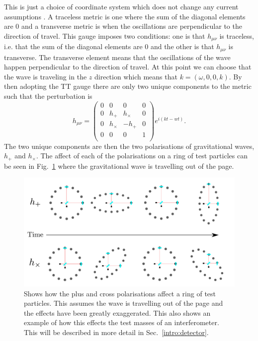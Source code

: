 This is just a choice of coordinate system which does not change any current assumptions . A traceless metric is one where the sum of the diagonal elements are 0 and a transverse metric is when the oscillations are perpendicular to the direction of travel. 
This gauge imposes two conditions: one is that $h_{\mu \nu}$ is traceless, i.e. that the sum of the diagonal elements are 0 and the other is that $h_{\mu \nu}$ is transverse. 
The transverse element means that the oscillations of the wave happen perpendicular to the direction of travel.
At this point we can choose that the wave is traveling in the $z$ direction which means that $k = (\omega,0,0,k)$.
By then adopting the TT gauge there are only two unique components to the metric such that the perturbation is
\begin{equation}
\label{intro:gw:gravwave}
h_{\mu \nu} = \left( 
\begin{matrix}
0 & 0 & 0 & 0 \\
0 & h_{+} & h_{\times} & 0 \\
0 & h_{\times} & -h_{+} & 0 \\
0 & 0 & 0 & 1 \\
\end{matrix}
\right) 
e^{i(kt - wt)}.
\end{equation}
The two unique components are then the two polarisations of gravitational waves, $h_{+}$ and $h_{\times}$.
The affect of each of the polarisations on a ring of test particles can be seen in Fig.~\ref{gw:polarisations} where the gravitational wave is travelling out of the page.

\begin{figure}[h]
    \centering
    \includegraphics[width=\textwidth]{C1_intro/polarisation_ring.pdf}
    \caption[Plus and Cross polarisations]{Shows how the plus and cross polarisations affect a ring of test particles. This assumes the wave is travelling out of the page and the effects have been greatly exaggerated. This also shows an example of how this effects the test masses of an interferometer. This will be described in more detail in Sec.~\ref{intro:detector}.}
    \label{gw:polarisations}
\end{figure}



